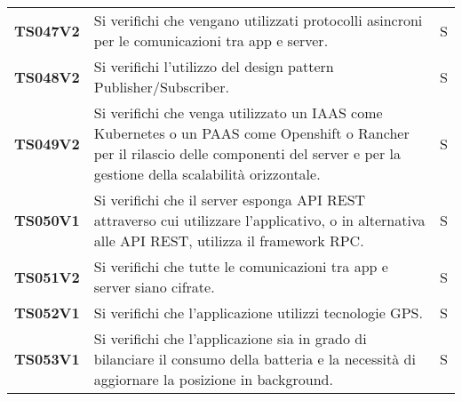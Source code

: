 \documentclass[../../piano-di-qualifica.tex]{subfiles}
\begin{document}
\begin{longtable}[H]{>{\centering\bfseries}m{3cm} >{}m{10cm} >{\centering\arraybackslash}m{3cm}}
  TS047V2            & Si verifichi che vengano utilizzati protocolli asincroni per le comunicazioni tra app e server.
                     & S                                                                                                                                                                                                                                                   \\

  TS048V2            & Si verifichi l'utilizzo del design pattern Publisher/Subscriber.
                     & S                                                                                                                                                                                                                                                   \\

  TS049V2            & Si verifichi che venga utilizzato un IAAS come Kubernetes o un PAAS come Openshift o Rancher per il rilascio delle componenti del server e per la gestione della scalabilità orizzontale.
                     & S
  \\
  TS050V1            & Si verifichi che il server esponga API REST attraverso cui utilizzare l'applicativo, o in alternativa alle API REST, utilizza il framework RPC\@.
                     & S                                                                                                                                                                                                                                                   \\

  TS051V2            & Si verifichi che tutte le comunicazioni tra app e server siano cifrate.
                     & S                                                                                                                                                                                                                                                  \\

  TS052V1            & Si verifichi che l'applicazione utilizzi tecnologie GPS\@.
                     & S                                                                                                                                                                                                                                                   \\

  TS053V1            & Si verifichi che l'applicazione sia in grado di bilanciare il consumo della batteria e la necessità di aggiornare la posizione in background.
                     & S                                                                                                                                                                                                                                                  \\


\end{longtable}
\end{document}
